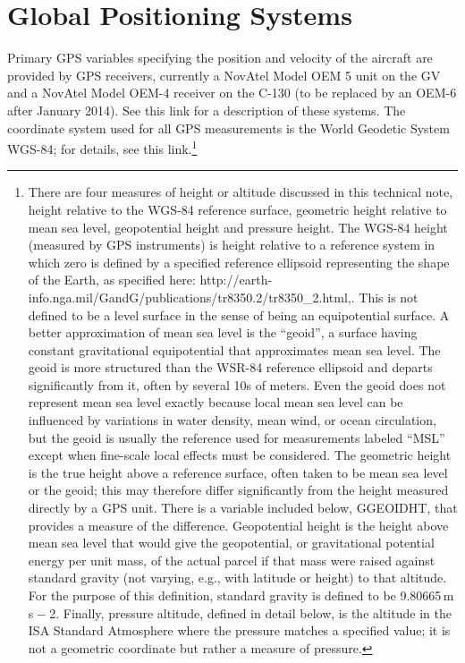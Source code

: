 \documentclass[
  english,
]{book}
\begin{document}
\hypertarget{global-positioning-systems}{%
\section{Global Positioning Systems}\label{global-positioning-systems}}

Primary GPS variables specifying the position and velocity of the aircraft are provided by GPS receivers, currently a NovAtel Model OEM 5 unit on the GV and a NovAtel Model OEM-4 receiver on the C-130 (to be replaced by an OEM-6 after January 2014). See this link for a description of these systems. The coordinate system used for all GPS measurements is the World Geodetic System WGS-84; for details, see this link.\footnote{There are four measures of height or altitude discussed in this technical note, height relative to the WGS-84 reference surface, geometric height relative to mean sea level, geopotential height and pressure height. The WGS-84 height (measured by GPS instruments) is height relative to a reference system in which zero is defined by a specified reference ellipsoid representing the shape of the Earth, as specified here: http://earth-info.nga.mil/GandG/publications/tr8350.2/tr8350\_2.html,. This is not defined to be a level surface in the sense of being an equipotential surface. A better approximation of mean sea level is the ``geoid'', a surface having constant gravitational equipotential that approximates mean sea level. The geoid is more structured than the WSR-84 reference ellipsoid and departs significantly from it, often by several 10s of meters. Even the geoid does not represent mean sea level exactly because local mean sea level can be influenced by variations in water density, mean wind, or ocean circulation, but the geoid is usually the reference used for measurements labeled ``MSL'' except when fine-scale local effects must be considered. The geometric height is the true height above a reference surface, often taken to be mean sea level or the geoid; this may therefore differ significantly from the height measured directly by a GPS unit. There is a variable included below, GGEOIDHT, that provides a measure of the difference. Geopotential height is the height above mean sea level that would give the geopotential, or gravitational potential energy per unit mass, of the actual parcel if that mass were raised against standard gravity (not varying, e.g., with latitude or height) to that altitude. For the purpose of this definition, standard gravity is defined to be 9.80665{ m s − 2}. Finally, pressure altitude, defined in detail below, is the altitude in the ISA Standard Atmosphere where the pressure matches a specified value; it is not a geometric coordinate but rather a measure of pressure.}
\end{document}
